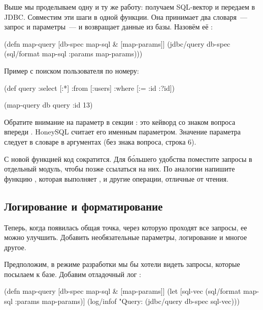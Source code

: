 Выше мы проделываем одну и ту же работу: получаем SQL-вектор и передаем в JDBC. Совместим эти шаги в одной функции. Она принимает два словаря~--- запрос и параметры~--- и возвращает данные из базы. Назовём её :

\begin{english}
  \begin{clojure/lines}
(defn map-query
  [db-spec map-sql & [map-params]]
  (jdbc/query db-spec
              (sql/format map-sql
                          {:params map-params})))
  \end{clojure/lines}
\end{english}

Пример с поиском пользователя по номеру:

\begin{english}
  \begin{clojure}
(def query
  {:select [:*]
   :from [:users]
   :where [:= :id :?id]})

(map-query db query {:id 13})
  \end{clojure}
\end{english}

Обратите внимание на параметр  в секции : это кейворд со знаком вопроса впереди . HoneySQL считает его именным параметром. Значение параметра следует в словаре  в аргументах  (без знака вопроса, строка 6).

С новой функцией код сократится. Для б\'{о}льшего удобства поместите запросы в отдельный модуль, чтобы позже ссылаться на них. По аналогии напишите функцию , которая выполняет ,  и другие операции, отличные от чтения.

\subsection{Логирование и форматирование}


Теперь, когда появилась общая точка, через которую проходят все запросы, ее можно улучшить. Добавить необязательные параметры, логирование и многое другое.

Предположим, в режиме разработки мы бы хотели видеть запросы, которые посылаем к базе. Добавим отладочный лог :

\begin{english}
  \begin{clojure/lines}
(defn map-query [db-spec map-sql & [map-params]]
  (let [sql-vec
        (sql/format map-sql {:params map-params})]
    (log/infof "Query: %
    (jdbc/query db-spec sql-vec)))
  \end{clojure/lines}
\end{english}


